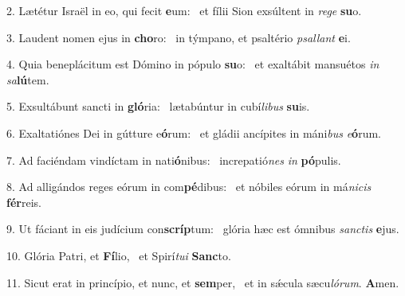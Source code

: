2. Lætétur Israël in eo, qui fecit \textbf{e}um: \ast\  et fílii Sion exsúltent in \textit{re}\textit{ge} \textbf{su}o.\

3. Laudent nomen ejus in \textbf{cho}ro: \ast\  in týmpano, et psaltério \textit{psal}\textit{lant} \textbf{e}i.\

4. Quia beneplácitum est Dómino in pópulo \textbf{su}o: \ast\  et exaltábit mansuétos \textit{in} \textit{sa}\textbf{lú}tem.\

5. Exsultábunt sancti in \textbf{gló}ria: \ast\  lætabúntur in cubí\textit{li}\textit{bus} \textbf{su}is.\

6. Exaltatiónes Dei in gútture e\textbf{ó}rum: \ast\  et gládii ancípites in máni\textit{bus} \textit{e}\textbf{ó}rum.\

7. Ad faciéndam vindíctam in nati\textbf{ó}nibus: \ast\  increpatió\textit{nes} \textit{in} \textbf{pó}pulis.\

8. Ad alligándos reges eórum in com\textbf{pé}dibus: \ast\  et nóbiles eórum in má\textit{ni}\textit{cis} \textbf{fér}reis.\

9. Ut fáciant in eis judícium con\textbf{scríp}tum: \ast\  glória hæc est ómnibus \textit{sanc}\textit{tis} \textbf{e}jus.\

10. Glória Patri, et \textbf{Fí}lio, \ast\  et Spirí\textit{tu}\textit{i} \textbf{Sanc}to.\

11. Sicut erat in princípio, et nunc, et \textbf{sem}per, \ast\  et in sǽcula sæcu\textit{ló}\textit{rum}. \textbf{A}men.\

